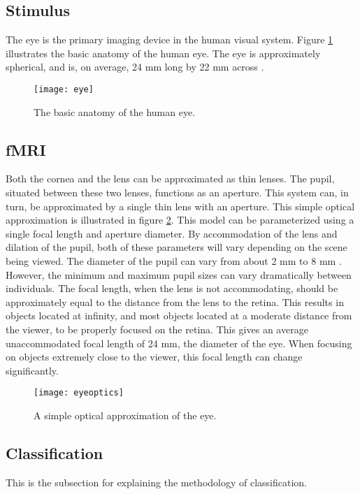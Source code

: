 \documentclass{article}
\begin{document}
\subsection{Stimulus}
The eye is the primary imaging device in the human visual system.
Figure \ref{eye} illustrates the basic anatomy of the human eye.
The eye is approximately spherical, and is, on average, 24 mm long by 22 mm across \cite{Hecht2001}.

\begin{figure}[!htbp]
\centering
\texttt{[image: eye]}
\caption{The basic anatomy of the human eye.}
\label{eye}
\end{figure}

\subsection{fMRI}
Both the cornea and the lens can be approximated as thin lenses.
The pupil, situated between these two lenses, functions as an aperture.
This system can, in turn, be approximated by a single thin lens with an aperture.
This simple optical approximation is illustrated in figure \ref{eyeoptics}.
This model can be parameterized using a single focal length and aperture diameter.
By accommodation of the lens and dilation of the pupil, both of these parameters will vary depending on the scene being viewed.
The diameter of the pupil can vary from about 2 mm to 8 mm \cite{Hecht2001}.
However, the minimum and maximum pupil sizes can vary dramatically between individuals.
The focal length, when the lens is not accommodating, should be approximately equal to the distance from the lens to the retina.
This results in objects located at infinity, and most objects located at a moderate distance from the viewer, to be properly focused on the retina.
This gives an average unaccommodated focal length of 24 mm, the diameter of the eye.
When focusing on objects extremely close to the viewer, this focal length can change significantly.

\begin{figure}[!htbp]
\centering
\texttt{[image: eyeoptics]}
\caption{A simple optical approximation of the eye.}
\label{eyeoptics}
\end{figure}

\subsection{Classification}
This is the subsection for explaining the methodology of classification.
\end{document}
